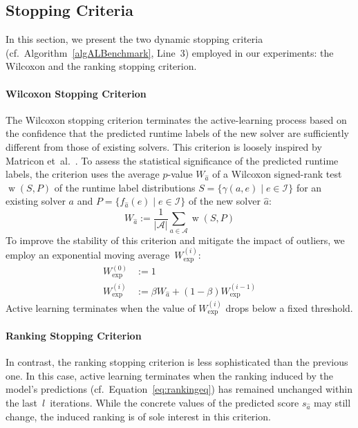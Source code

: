\documentclass[sn-basic, Numbered]{sn-jnl} %
\begin{document}
\subsection{Stopping Criteria}
\label{sec:main:stopping}

In this section, we present the two dynamic stopping criteria (cf.~Algorithm~\ref{algALBenchmark}, Line~3) employed in our experiments: the Wilcoxon and the ranking stopping criterion.

\paragraph{Wilcoxon Stopping Criterion}

The Wilcoxon stopping criterion terminates the active-learning process based on the confidence that the predicted runtime labels of the new solver are sufficiently different from those of existing solvers.
This criterion is loosely inspired by Matricon et~al.~\cite{MatriconAFSH21}.
To assess the statistical significance of the predicted runtime labels, the criterion uses the average $p$-value $W_{\hat{a}}$ of a Wilcoxon signed-rank test $\operatorname{w}(S,P)$ of the runtime label distributions ${S=\{ \gamma(a, e) \mid e \in \mathcal{I} \}}$ for an existing solver $a$ and \mbox{$P=\{ f_{\hat a}(e) \mid e \in \mathcal{I} \}$} of the new solver $\hat{a}$:
%
\begin{equation*}
  W_{\hat{a}} := \frac{1}{\lvert \mathcal{A} \rvert} \sum_{a \in \mathcal{A}} \operatorname{w}(S, P)
\end{equation*}
%
To improve the stability of this criterion and mitigate the impact of outliers, we employ an exponential moving average~$W^{(i)}_{\exp}$:
%
\begin{align*}
  W_{\exp}^{\left(0\right)} &:= 1\\
  W_{\exp}^{\left(i\right)} &:= \beta W_{\hat{a}} + \left(1 - \beta\right) W_{\exp}^{\left(i - 1\right)}
\end{align*}
%
Active learning terminates when the value of $W^{(i)}_{\exp}$ drops below a fixed threshold.

\paragraph{Ranking Stopping Criterion}

In contrast, the ranking stopping criterion is less sophisticated than the previous one.
In this case, active learning terminates when the ranking induced by the model's predictions (cf.~Equation~\eqref{eq:rankingeq}) has remained unchanged within the last~$l$~iterations.
While the concrete values of the predicted score $s_{\hat a}$ may still change, the induced ranking is of sole interest in this criterion.
\end{document}
